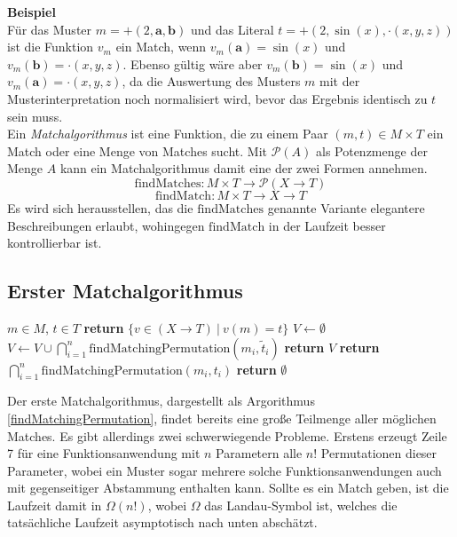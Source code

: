 \documentclass{scrartcl}
\begin{document}
\textbf{Beispiel}\\
Für das Muster $m = +(2, \mathbf a, \mathbf b)$ und das Literal $t = +(2, \sin(x), \cdot(x, y, z))$ ist die Funktion $v_m$ ein Match, wenn $v_m(\mathbf a) = \sin(x)$ und $v_m(\mathbf b) = \cdot(x, y, z)$. Ebenso gültig wäre aber $v_m(\mathbf b) = \sin(x)$ und $v_m(\mathbf a) = \cdot(x, y, z)$, da die Auswertung des Musters $m$ mit der Musterinterpretation noch normalisiert wird, bevor das Ergebnis identisch zu $t$ sein muss.\\

Ein \emph{Matchalgorithmus} ist eine Funktion, die zu einem Paar $(m, t) \in M \times T$ ein Match oder eine Menge von Matches sucht. Mit $\mathcal{P}(A)$ als Potenzmenge der Menge $A$ kann ein Matchalgorithmus damit eine der zwei Formen annehmen.
$$\mathrm{findMatches} \colon M \times T \rightarrow \mathcal{P}(X \rightarrow T)$$
$$\mathrm{findMatch} \colon M \times T \rightarrow X \rightarrow T$$
Es wird sich herausstellen, das die $\mathrm{findMatches}$ genannte Variante elegantere Beschreibungen erlaubt, wohingegen $\mathrm{findMatch}$ in der Laufzeit besser kontrollierbar ist.

\subsection{Erster Matchalgorithmus}

\begin{algorithm}
\caption{$\mathrm{findMatchingPermutation} \colon M \times T \rightarrow \mathcal{P}(X \rightarrow T)$}\label{findMatchingPermutation}
\begin{algorithmic}[1] %
\Require $m \in M$, $t \in T$
	\State \textbf{return} $\{v \in (X \rightarrow T) ~|~ v(m) = t\}$ 
\EndIf
{}
		\State $V \leftarrow \emptyset$
			\State $V \leftarrow V \cup \bigcap_{i = 1}^n {\mathrm{findMatchingPermutation}(m_i, \tilde t_i)}$
		\EndFor
		\State \textbf{return} $V$
	\Else
		\State \textbf{return} $\bigcap_{i = 1}^n {\mathrm{findMatchingPermutation}(m_i, t_i)}$
	\EndIf
\EndIf
\State \textbf{return} $\emptyset$
\end{algorithmic}
\end{algorithm}

Der erste Matchalgorithmus, dargestellt als Argorithmus \ref{findMatchingPermutation}, findet bereits eine große Teilmenge aller möglichen Matches. Es gibt allerdings zwei schwerwiegende Probleme. Erstens erzeugt Zeile 7 für eine Funktionsanwendung mit $n$ Parametern alle $n!$ Permutationen dieser Parameter, wobei ein Muster sogar mehrere solche Funktionsanwendungen auch mit gegenseitiger Abstammung enthalten kann. Sollte es ein Match geben, ist die Laufzeit damit in $\Omega(n!)$, wobei  $\Omega$ das Landau-Symbol ist, welches die tatsächliche Laufzeit asymptotisch nach unten abschätzt.
\end{document}
